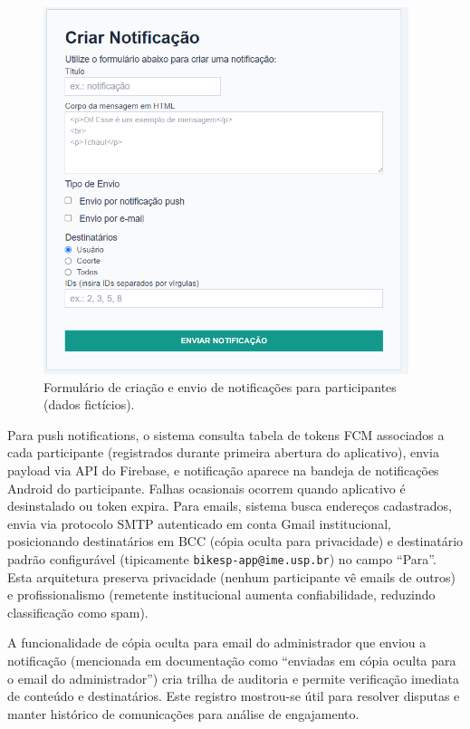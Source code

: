  \begin{figure}[H]
   \centering
   \includegraphics[width=0.95\textwidth]{figuras/notificacao_criar.PNG}
   \caption{Formulário de criação e envio de notificações para participantes (dados fictícios).}
   \label{fig:notificacao_criar}
 \end{figure}

Para push notifications, o sistema consulta tabela de tokens FCM associados a cada participante (registrados durante primeira abertura do aplicativo), envia payload via API do Firebase, e notificação aparece na bandeja de notificações Android do participante. Falhas ocasionais ocorrem quando aplicativo é desinstalado ou token expira. Para emails, sistema busca endereços cadastrados, envia via protocolo SMTP autenticado em conta Gmail institucional, posicionando destinatários em BCC (cópia oculta para privacidade) e destinatário padrão configurável (tipicamente \texttt{bikesp-app@ime.usp.br}) no campo ``Para''. Esta arquitetura preserva privacidade (nenhum participante vê emails de outros) e profissionalismo (remetente institucional aumenta confiabilidade, reduzindo classificação como spam).

A funcionalidade de cópia oculta para email do administrador que enviou a notificação (mencionada em documentação como ``enviadas em cópia oculta para o email do administrador'') cria trilha de auditoria e permite verificação imediata de conteúdo e destinatários. Este registro mostrou-se útil para resolver disputas e manter histórico de comunicações para análise de engajamento.

